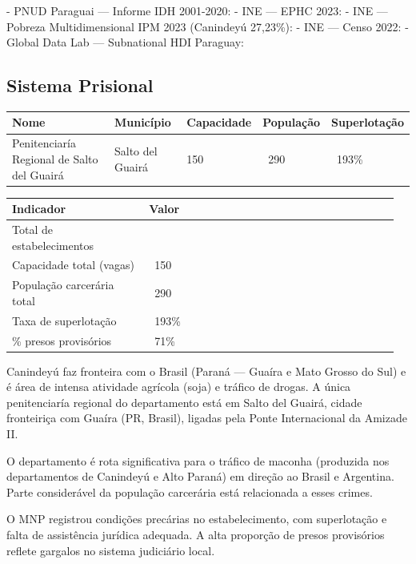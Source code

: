 - PNUD Paraguai --- Informe IDH 2001-2020: 
- INE --- EPHC 2023: 
- INE --- Pobreza Multidimensional IPM 2023 (Canindeyú 27,23\%): 
- INE --- Censo 2022: 
- Global Data Lab --- Subnational HDI Paraguay: 


\subsection{Sistema Prisional}



{\small
\setlength{\tabcolsep}{3pt}
\renewcommand{\arraystretch}{1.12}
{\small
\begin{tabularx}{\linewidth}{lXXXX}
\toprule
Nome & Município & Capacidade & População & Superlotação \\
\midrule
Penitenciaría Regional de Salto del Guairá & Salto del Guairá & 150 & ~290 & ~193\% \\
\bottomrule
\end{tabularx}
}
}


{\small
\setlength{\tabcolsep}{3pt}
\renewcommand{\arraystretch}{1.12}
\begin{tabularx}{\linewidth}{>{\raggedright\arraybackslash}p{0.34\linewidth} >{\raggedright\arraybackslash}p{0.62\linewidth}}
\toprule
Indicador & Valor \\
\midrule
Total de estabelecimentos & 1 \\
Capacidade total (vagas) & ~150 \\
População carcerária total & ~290 \\
Taxa de superlotação & ~193\% \\
\% presos provisórios & ~71\% \\
\bottomrule
\end{tabularx}
}


Canindeyú faz fronteira com o Brasil (Paraná --- Guaíra e Mato Grosso do Sul) e é área de intensa atividade agrícola (soja) e tráfico de drogas. A única penitenciaría regional do departamento está em Salto del Guairá, cidade fronteiriça com Guaíra (PR, Brasil), ligadas pela Ponte Internacional da Amizade II.

O departamento é rota significativa para o tráfico de maconha (produzida nos departamentos de Canindeyú e Alto Paraná) em direção ao Brasil e Argentina. Parte considerável da população carcerária está relacionada a esses crimes.

O MNP registrou condições precárias no estabelecimento, com superlotação e falta de assistência jurídica adequada. A alta proporção de presos provisórios reflete gargalos no sistema judiciário local.


